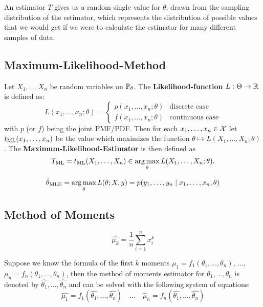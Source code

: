 An estimator $T$ gives us a random single value for $\theta$, drawn from the sampling distribution of the estimator, which represents the distribution of possible values that we would get if we were to calculate the estimator for many different samples of data.

\subsection{Maximum-Likelihood-Method}
Let \(X_1, \ldots, X_n\) be random variables on \(\P_\theta\). The \textbf{Likelihood-function} \(L: \Theta \to \R\) is defined as:
\[L(x_1, \ldots, x_n ; \theta) = \begin{cases}
  p(x_1, \ldots, x_n ; \theta) & \text{discrete case} \\
  f(x_1, \ldots, x_n ; \theta) & \text{continuous case}
\end{cases}\]
with \(p\) (or \(f\)) being the joint PMF/PDF.
Then for each \(x_1, \ldots, x_n \in \DX\) let \(t_{\ML}(x_1, \ldots, x_n)\) be the value which maximizes the function \(\theta \mapsto L(X_1, \ldots, X_n ; \theta)\).
The \textbf{Maximum-Likelihood-Estimator} is then defined as
\[T_{\ML} = t_{\ML}(X_1, \ldots, X_n) \in \underset{\theta}{\arg\max} \, L(X_1, \ldots, X_n ; \theta).\]

\begin{note*}
  \[\hat{\theta}_{\MLE} = \underset{\theta}{\arg\max} \, L(\theta; X, y) = p(y_1, \ldots, y_n \mid x_1, \ldots, x_n, \theta)\]
\end{note*}

\subsection{Method of Moments}
\begin{definition*}
  \[\hat{\mu_k} = \frac{1}{n} \sum_{i=1}^n x_i^k\]
\end{definition*}

Suppose we know the formula of the first \(k\) moments \(\mu_1 = f_1(\theta_1, \ldots, \theta_n)\), \(\ldots\), \(\mu_n = f_n(\theta_1, \ldots, \theta_n)\), then the method of moments estimator for \(\theta_1, \ldots, \theta_n\) is denoted by \(\hat{\theta_1}, \ldots, \hat{\theta_n}\) and can be solved with the following system of equations:
\[\hat{\mu_1} = f_1(\hat{\theta_1}, \ldots, \hat{\theta_n}) \quad \ldots \quad \hat{\mu}_n = f_n(\hat{\theta_1}, \ldots, \hat{\theta_n})\]

